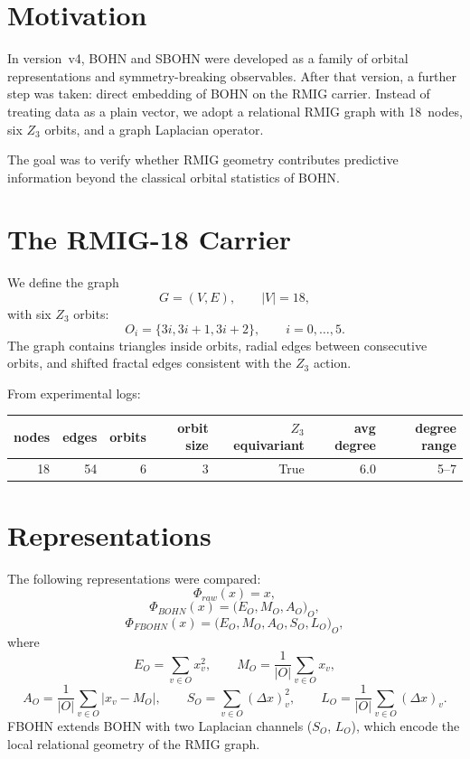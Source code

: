 \documentclass[11pt,a4paper]{report}
\begin{document}
\section{Motivation}

In version~v4, BOHN and SBOHN were developed as a family of orbital representations and symmetry-breaking observables. After that version, a further step was taken: direct embedding of BOHN on the RMIG carrier. Instead of treating data as a plain vector, we adopt a relational RMIG graph with 18~nodes, six $Z_3$ orbits, and a graph Laplacian operator.

The goal was to verify whether RMIG geometry contributes predictive information beyond the classical orbital statistics of BOHN.

\section{The RMIG-18 Carrier}

We define the graph
\[
G=(V,E),\qquad |V|=18,
\]
with six $Z_3$ orbits:
\[
O_i=\{3i,3i+1,3i+2\},\qquad i=0,\ldots,5.
\]
The graph contains triangles inside orbits, radial edges between consecutive orbits, and shifted fractal edges consistent with the $Z_3$ action.

From experimental logs:
\begin{center}
\begin{tabular}{rrrrrrr}
\toprule
nodes & edges & orbits & orbit size & $Z_3$ equivariant & avg degree & degree range\\
\midrule
18 & 54 & 6 & 3 & True & 6.0 & 5--7\\
\bottomrule
\end{tabular}
\end{center}

\section{Representations}

The following representations were compared:
\[
\Phi_{raw}(x)=x,
\]
\[
\Phi_{BOHN}(x)=\big(E_O,M_O,A_O\big)_O,
\]
\[
\Phi_{FBOHN}(x)=\big(E_O,M_O,A_O,S_O,L_O\big)_O,
\]
where
\[
E_O=\sum_{v\in O}x_v^2,
\qquad
M_O=\frac{1}{|O|}\sum_{v\in O}x_v,
\]
\[
A_O=\frac{1}{|O|}\sum_{v\in O}|x_v-M_O|,
\qquad
S_O=\sum_{v\in O}(\Delta x)_v^2,
\qquad
L_O=\frac{1}{|O|}\sum_{v\in O}(\Delta x)_v.
\]
FBOHN extends BOHN with two Laplacian channels ($S_O$, $L_O$), which encode the local relational geometry of the RMIG graph.
\end{document}
